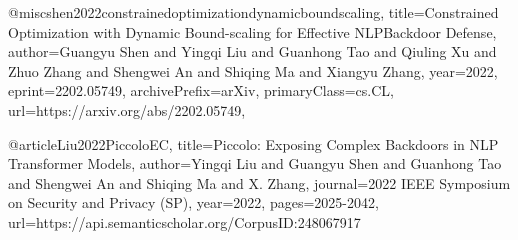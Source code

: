 @misc{shen2022constrainedoptimizationdynamicboundscaling,
      title={Constrained Optimization with Dynamic Bound-scaling for Effective NLPBackdoor Defense}, 
      author={Guangyu Shen and Yingqi Liu and Guanhong Tao and Qiuling Xu and Zhuo Zhang and Shengwei An and Shiqing Ma and Xiangyu Zhang},
      year={2022},
      eprint={2202.05749},
      archivePrefix={arXiv},
      primaryClass={cs.CL},
      url={https://arxiv.org/abs/2202.05749}, 
}

@article{Liu2022PiccoloEC,
  title={Piccolo: Exposing Complex Backdoors in NLP Transformer Models},
  author={Yingqi Liu and Guangyu Shen and Guanhong Tao and Shengwei An and Shiqing Ma and X. Zhang},
  journal={2022 IEEE Symposium on Security and Privacy (SP)},
  year={2022},
  pages={2025-2042},
  url={https://api.semanticscholar.org/CorpusID:248067917}
}